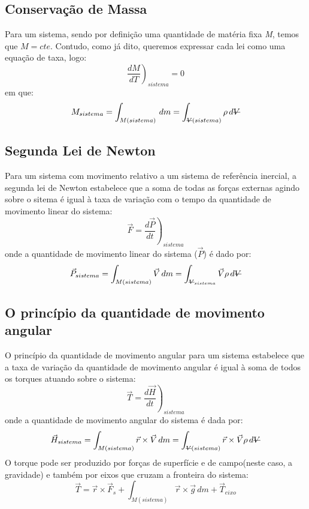 \documentclass{article}
\newcommand{\stkout}[1]{\ifmmode\text{\sout{\ensuremath{#1}}}\else\sout{#1}\fi}
\begin{document}
\subsection{Conservação de Massa}
Para um sistema, sendo por definição uma quantidade de matéria fixa \textit{M}, temos que $M=cte$. Contudo, como já dito, queremos expressar cada lei como uma equação de taxa, logo:
\begin{equation}
  \left.\frac{dM}{dT}\right)_{sistema} = 0
  \label{eq:conservacaoDeMassa}
\end{equation}
em que:
\begin{equation}
  M_{sistema}=\int_{M(sistema)}^{ } \, dm = \int_{\stkout{V}(sistema)}^{ } \rho\, d\stkout{V}
  \label{eq:massaFormula}
\end{equation}
\subsection{Segunda Lei de Newton}
Para um sistema com movimento relativo a um sistema de referência inercial, a segunda lei de Newton estabelece que a soma de todas as forças externas agindo sobre o sitema é igual à taxa de variação com o tempo da quantidade de movimento linear do sistema:
\begin{equation}
  \vec{F}=\left.\frac{d\vec{P}}{dt}\right)_{sistema}
  \label{eq:segundaLeiNewton}
\end{equation}
onde a quantidade de movimento linear do sistema ($\vec{P}$) é dado por:
\begin{equation}
  \vec{P}_{sistema}=\int_{M(sistema)}^{ } \vec{V}\, dm = \int_{\stkout{V}_{sistema}}^{ } \vec{V} \rho\, d\stkout{V} 
  \label{eq:movimentoLinearFormula}
\end{equation}
\subsection{O princípio da quantidade de movimento angular}
O princípio da quantidade de movimento angular para um sistema estabelece que a taxa de variação da quantidade de movimento angular é igual à soma de todos os torques atuando sobre o sistema:
\begin{equation}
  \vec{T}=\left.\frac{d\vec{H}}{dt}\right)_{sistema}
  \label{eq:TorqueIgualVariacaoMovimentoAngular}
\end{equation}
onde a quantidade de movimento angular do sistema é dada por:
\begin{equation}
  \vec{H}_{sistema}=\int_{M(sistema)}^{ } \vec{r} \times \vec{V}\, dm = \int_{\stkout{V}(sistema)}^{ } \vec{r} \times \vec{V} \rho \, d\stkout{V}
  \label{eq:qntMovimentoAngular}
\end{equation}
O torque pode ser produzido por forças de superfície e de campo(neste caso, a gravidade) e também por eixos que cruzam a fronteira do sistema:
\begin{equation}
  \vec{T}=\vec{r} \times \vec{F}_s + \int_{M(sistema)}^{ } \vec{r} \times \vec{g}\, dm + \vec{T}_{eixo} 
  \label{eq:torque}
\end{equation}
\end{document}
